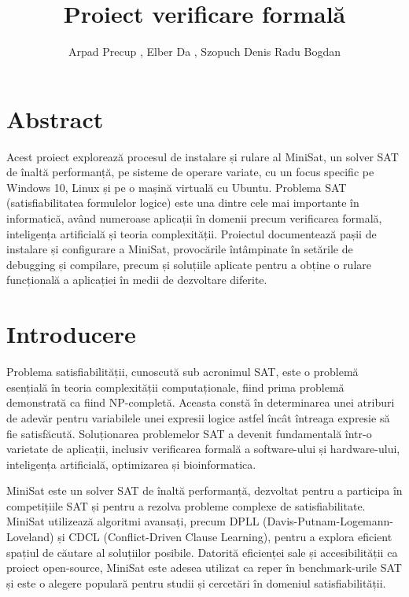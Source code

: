 \documentclass{llncs}
\begin{document}
\title{Proiect verificare formală}
\author{Arpad Precup , Elber Da , Szopuch Denis  Radu Bogdan }

\maketitle
\newpage

\section{Abstract}
Acest proiect explorează procesul de instalare și rulare al MiniSat, un solver SAT de înaltă performanță, pe sisteme de operare variate, cu un focus specific pe Windows 10, Linux și pe o mașină virtuală cu Ubuntu. Problema SAT (satisfiabilitatea formulelor logice) este una dintre cele mai importante în informatică, având numeroase aplicații în domenii precum verificarea formală, inteligența artificială și teoria complexității. Proiectul documentează pașii de instalare și configurare a MiniSat, provocările întâmpinate în setările de debugging și compilare, precum și soluțiile aplicate pentru a obține o rulare funcțională a aplicației în medii de dezvoltare diferite.


\section{Introducere}

Problema satisfiabilității, cunoscută sub acronimul SAT, este o problemă esențială în teoria complexității computaționale, fiind prima problemă demonstrată ca fiind NP-completă. Aceasta constă în determinarea unei atriburi de adevăr pentru variabilele unei expresii logice astfel încât întreaga expresie să fie satisfăcută. Soluționarea problemelor SAT a devenit fundamentală într-o varietate de aplicații, inclusiv verificarea formală a software-ului și hardware-ului, inteligența artificială, optimizarea și bioinformatica.

MiniSat este un solver SAT de înaltă performanță, dezvoltat pentru a participa în competițiile SAT și pentru a rezolva probleme complexe de satisfiabilitate. MiniSat utilizează algoritmi avansați, precum DPLL (Davis-Putnam-Logemann-Loveland) și CDCL (Conflict-Driven Clause Learning), pentru a explora eficient spațiul de căutare al soluțiilor posibile. Datorită eficienței sale și accesibilității ca proiect open-source, MiniSat este adesea utilizat ca reper în benchmark-urile SAT și este o alegere populară pentru studii și cercetări în domeniul satisfiabilității.
\end{document}
